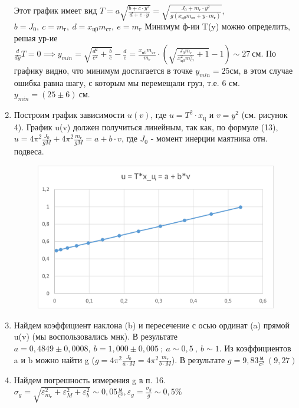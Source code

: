 \documentclass[a4paper,12pt]{article} %
\begin{document}
\begin{enumerate}
Этот график имеет вид $T = a\sqrt{\frac{b+c \cdot y^2}{d+e \cdot y}} = \sqrt{\frac{J_0 + m_{\text{г}} \cdot y^2}{g (x_{\text{ц0}} m_{\text{ст}} + y \cdot m_{\text{г}})}}$,
$b = J_0,\ c = m_{\text{г}},\ d = x_{\text{ц0}} m_{\text{ст}},\ e = m_{\text{г}}$
Минимум ф-ии T(y) можно определить, решая ур-ие
$\frac{d}{dy} T = 0 \implies y_{min} = \sqrt{\frac{d^2}{e^2} + \frac{b}{c}} - \frac{d}{e} =
	\frac{x_\text{ц0} m_\text{ст}}{m_\text{г}} \cdot (\sqrt{\frac{J_0 m_\text{г}}{x_\text{ц0}^2 m_\text{ст}^2} + 1} - 1) \sim 27\ \text{см}$.
По графику видно, что минимум достигается в точке $ y_{min} = 25 \text{см} $, в этом случае ошибка равна шагу, с которым мы перемещали груз, т.е. 6 см.
$ y_{min} = (25 \pm 6)\ \text{см} $.

\item Построим график зависимости $u(v)$, где $u = T^2 \cdot x_{\text{ц}}$ и $v = y^2$ (см. рисунок 4). График u(v) должен получиться линейным, так как, по формуле (13), $u = 4\pi^2 \frac{J_0}{gM} + 4\pi^2 \frac{m_{\text{г}}}{gM} = a + b \cdot v$, где $J_0$ - момент инерции маятника отн. подвеса.

\begin{figure} [h]
	\center
	\includegraphics[scale = 0.8]{./141/u(v).png}
\end{figure}

\item Найдем коэффициент наклона (b) и пересечение с осью ординат (a) прямой u(v) (мы воспользовались мнк). В результате $a = 0,4849 \pm 0,0008,\ b = 1,000 \pm 0,005\ ;\ a \sim 0,5\ ,\ b \sim 1$. Из коэффициентов a и b можно найти g ($g = 4\pi^2 \frac{J_0}{a \cdot M} = 4\pi^2 \frac{m_{\text{г}}}{b \cdot M}$).
В результате $ g = 9,83 \frac{\text{м}}{\text{с}^2}\ (9,27)$

\item Найдем погрешность измерения g в п. 16.
$ \sigma_g = \sqrt{\varepsilon_{m_{\text{г}}}^2 + \varepsilon_{M}^2 + \varepsilon_{b}^2} \sim 0,05 \frac{\text{м}}{\text{с}^2}, \varepsilon_g = \frac{\sigma_g}{g} \sim 0,5\% $


\end{enumerate}
\end{document}

